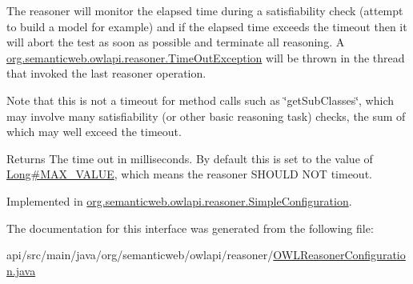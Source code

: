 The reasoner will monitor the elapsed time during a satisfiability check (attempt to build a model for example) and if the elapsed time exceeds the timeout then it will abort the test as soon as possible and terminate all reasoning. A \hyperlink{classorg_1_1semanticweb_1_1owlapi_1_1reasoner_1_1_time_out_exception}{org.\-semanticweb.\-owlapi.\-reasoner.\-Time\-Out\-Exception} will be thrown in the thread that invoked the last reasoner operation. 

Note that this is not a timeout for method calls such as \char`\"{}get\-Sub\-Classes\char`\"{}, which may involve many satisfiability (or other basic reasoning task) checks, the sum of which may well exceed the timeout. \begin{DoxyReturn}{Returns}
The time out in milliseconds. By default this is set to the value of \hyperlink{}{Long\#\-M\-A\-X\-\_\-\-V\-A\-L\-U\-E}, which means the reasoner S\-H\-O\-U\-L\-D N\-O\-T timeout. 
\end{DoxyReturn}


Implemented in \hyperlink{classorg_1_1semanticweb_1_1owlapi_1_1reasoner_1_1_simple_configuration_afc6a806b0bec095a1dfd3771ad14509b}{org.\-semanticweb.\-owlapi.\-reasoner.\-Simple\-Configuration}.



The documentation for this interface was generated from the following file\-:\begin{DoxyCompactItemize}
\item 
api/src/main/java/org/semanticweb/owlapi/reasoner/\hyperlink{_o_w_l_reasoner_configuration_8java}{O\-W\-L\-Reasoner\-Configuration.\-java}\end{DoxyCompactItemize}
